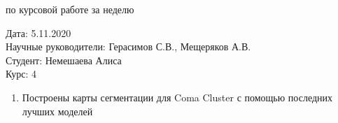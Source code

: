 \documentclass{article}
\begin{document}
\begin{center}{ по курсовой работе за неделю\\}\end{center}
Дата: 5.11.2020\\
Научные руководители: Герасимов С.В., Мещеряков А.В.\\
Студент: Немешаева Алиса\\
Курс: 4\\

\renewcommand{\labelitemi}{$\blacksquare$}
\renewcommand\labelitemii{$\square$}
\begin{enumerate}
    \item Построены карты сегментации для Coma Cluster с помощью последних лучших моделей\\
        \begin{figure}[h]


\end{figure}
\end{enumerate}
\end{document}
